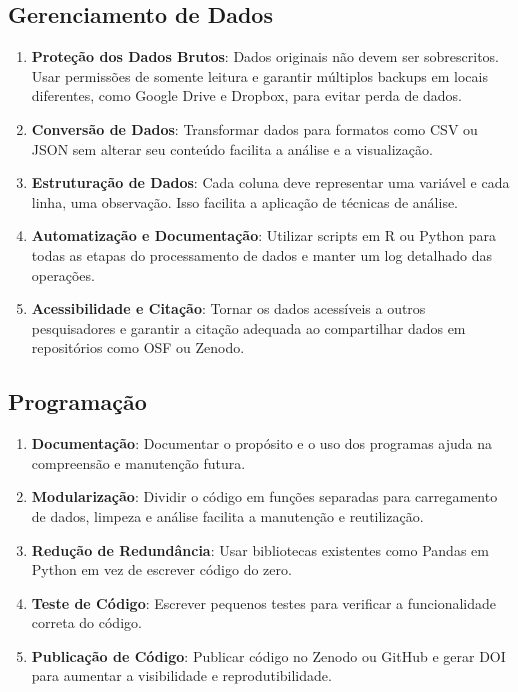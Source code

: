 \documentclass[
  a4paper,
]{article}
\providecommand{\tightlist}{%
  \setlength{\itemsep}{0pt}\setlength{\parskip}{0pt}}\usepackage{longtable,booktabs,array}
\begin{document}
\subsection{Gerenciamento de Dados}\label{gerenciamento-de-dados}

\begin{enumerate}
\def\labelenumi{\arabic{enumi}.}
\tightlist
\item
  \textbf{Proteção dos Dados Brutos}: Dados originais não devem ser
  sobrescritos. Usar permissões de somente leitura e garantir múltiplos
  backups em locais diferentes, como Google Drive e Dropbox, para evitar
  perda de dados.
\item
  \textbf{Conversão de Dados}: Transformar dados para formatos como CSV
  ou JSON sem alterar seu conteúdo facilita a análise e a visualização.
\item
  \textbf{Estruturação de Dados}: Cada coluna deve representar uma
  variável e cada linha, uma observação. Isso facilita a aplicação de
  técnicas de análise.
\item
  \textbf{Automatização e Documentação}: Utilizar scripts em R ou Python
  para todas as etapas do processamento de dados e manter um log
  detalhado das operações.
\item
  \textbf{Acessibilidade e Citação}: Tornar os dados acessíveis a outros
  pesquisadores e garantir a citação adequada ao compartilhar dados em
  repositórios como OSF ou Zenodo.
\end{enumerate}

\subsection{Programação}\label{programauxe7uxe3o}

\begin{enumerate}
\def\labelenumi{\arabic{enumi}.}
\tightlist
\item
  \textbf{Documentação}: Documentar o propósito e o uso dos programas
  ajuda na compreensão e manutenção futura.
\item
  \textbf{Modularização}: Dividir o código em funções separadas para
  carregamento de dados, limpeza e análise facilita a manutenção e
  reutilização.
\item
  \textbf{Redução de Redundância}: Usar bibliotecas existentes como
  Pandas em Python em vez de escrever código do zero.
\item
  \textbf{Teste de Código}: Escrever pequenos testes para verificar a
  funcionalidade correta do código.
\item
  \textbf{Publicação de Código}: Publicar código no Zenodo ou GitHub e
  gerar DOI para aumentar a visibilidade e reprodutibilidade.
\end{enumerate}
\end{document}
